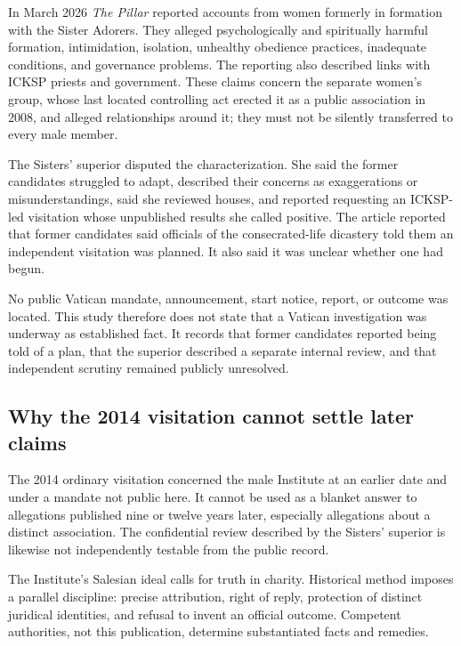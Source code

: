 In March 2026 \emph{The Pillar} reported accounts from women formerly in formation with the Sister Adorers. They alleged psychologically and spiritually harmful formation, intimidation, isolation, unhealthy obedience practices, inadequate conditions, and governance problems. The reporting also described links with ICKSP priests and government. These claims concern the separate women's group, whose last located controlling act erected it as a public association in 2008, and alleged relationships around it; they must not be silently transferred to every male member.

The Sisters' superior disputed the characterization. She said the former candidates struggled to adapt, described their concerns as exaggerations or misunderstandings, said she reviewed houses, and reported requesting an ICKSP-led visitation whose unpublished results she called positive. The article reported that former candidates said officials of the consecrated-life dicastery told them an independent visitation was planned. It also said it was unclear whether one had begun.

No public Vatican mandate, announcement, start notice, report, or outcome was located. This study therefore does not state that a Vatican investigation was underway as established fact. It records that former candidates reported being told of a plan, that the superior described a separate internal review, and that independent scrutiny remained publicly unresolved.

\subsection{Why the 2014 visitation cannot settle later claims}

The 2014 ordinary visitation concerned the male Institute at an earlier date and under a mandate not public here. It cannot be used as a blanket answer to allegations published nine or twelve years later, especially allegations about a distinct association. The confidential review described by the Sisters' superior is likewise not independently testable from the public record.

The Institute's Salesian ideal calls for truth in charity. Historical method imposes a parallel discipline: precise attribution, right of reply, protection of distinct juridical identities, and refusal to invent an official outcome. Competent authorities, not this publication, determine substantiated facts and remedies.

